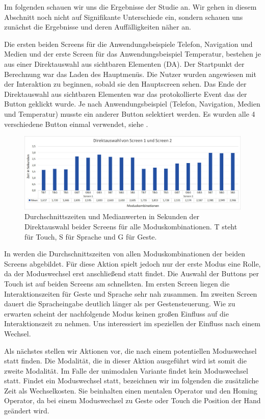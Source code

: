 Im folgenden schauen wir uns die Ergebnisse der Studie an. Wir gehen in diesem Abschnitt noch nicht auf Signifikante Unterschiede ein, sondern schauen uns zunächst die Ergebnisse und deren Auffälligkeiten näher an. 

Die ersten beiden Screens für die Anwendungsbeispiele Telefon, Navigation und Medien und der erste Screen für das Anwendungsbeispiel Temperatur, bestehen je aus einer Direktauswahl aus sichtbaren Elementen (DA). Der Startpunkt der Berechnung war das Laden des Hauptmenüs. Die Nutzer wurden angewiesen mit der Interaktion zu beginnen, sobald sie den Hauptscreen sehen. Das Ende der Direktauswahl aus sichtbaren Elementen war das protokollierte Event das der Button geklickt wurde. Je nach Anwendungsbeispiel (Telefon, Navigation, Medien und Temperatur) musste ein anderer Button selektiert werden. Es wurden alle 4 verschiedene Button einmal verwendet, siehe .
\begin{figure}[ht]
  \centering
  \includegraphics[width=1\textwidth]{img/DA_Screen12.JPG}
  \caption[Durchschnittszeiten in Sekunden der Direktauswahl]{Durchschnittszeiten und Medianwerten in Sekunden der Direktauswahl beider Screens für alle Moduskombinationen. T steht für Touch, S für Sprache und G für Geste.}
  \label{fig:DA_Screen12}
\end{figure}
In  werden die Durchschnittszeiten von allen Moduskombinationen der beiden Screens abgebildet. 
Für diese Aktion spielt jedoch nur der erste Modus eine Rolle, da der Moduswechsel erst anschließend statt findet. 
Die Auswahl der Buttons per Touch ist auf beiden Screens am schnellsten. 
Im ersten Screen liegen die Interaktionszeiten für Geste und Sprache sehr nah zusammen. 
Im zweiten Screen dauert die Spracheingabe deutlich länger als per Gestensteuerung.
Wie zu erwarten scheint der nachfolgende Modus keinen großen Einfluss auf die Interaktionszeit zu nehmen. 
Uns interessiert im speziellen der Einfluss nach einem Wechsel. 

Als nächstes stellen wir Aktionen vor, die nach einem potentiellen Moduswechsel statt finden. 
Die Modalität, die in dieser Aktion ausgeführt wird ist somit die zweite Modalität. 
Im Falle der unimodalen Variante findet kein Moduswechsel statt. 
Findet ein Moduswechsel statt, bezeichnen wir im folgenden die zusätzliche Zeit als Wechselkosten. 
Sie beinhalten einen mentalen Operator und den Homing Operator, da bei einem Moduswechsel zu Geste oder Touch die Position der Hand geändert wird.

